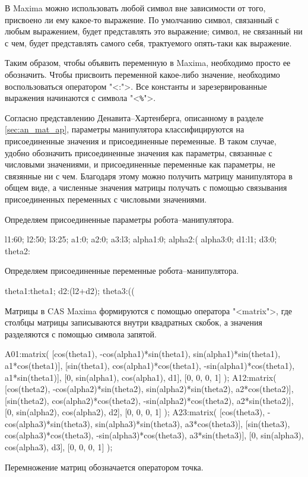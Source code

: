 \documentclass[oneside, final, 14pt]{extarticle}
\begin{document}
{В Maxima можно использовать любой символ вне зависимости от того, присвоено ли ему какое-то выражение.
По умолчанию символ, связанный с любым выражением, будет представлять это выражение; символ, не связанный ни с чем, будет представлять самого себя, трактуемого опять-таки как выражение.
\par
Таким образом, чтобы объявить переменную в Maxima, необходимо просто ее обозначить.
Чтобы присвоить переменной какое-либо значение, необходимо воспользоваться оператором "<{\ttfamily :}">.
Все константы и зарезервированные выражения начинаются с символа "<{\ttfamily \verb|%|}">.
\par
Согласно представлению Денавита--Хартенберга, описанному в разделе \ref{sec:an_mat_ap}, параметры манипулятора классифицируются на присоединенные значения и присоединенные переменные.
В таком случае, удобно обозначить присоединенные значения как параметры, связанные с числовыми значениями, и присоединенные переменные как параметры, не связянные ни с чем.
Благодаря этому можно получить матрицу манипулятора в общем виде, а численные значения матрицы получать с помощью связывания присоединенных переменных с числовыми значениями.
\par
Определяем присоединенные параметры робота--манипулятора.

{\small
\begin{listing}{24}
l1:60;
l2:50;
l3:25;
a1:0;
a2:0;
a3:l3;
alpha1:0;
alpha2:(%
alpha3:0;
d1:l1;
d3:0;
theta2:%
\end{listing}
}
\par
Определяем присоединенные переменные робота--манипулятора.

{\small
\begin{listing}{37}
theta1:theta1;
d2:(l2+d2);
theta3:((%
\end{listing}
}
\par
Матрицы в CAS Maxima формируются с помощью оператора "<{\ttfamily matrix}">, где столбцы матрицы записываются внутри квадратных скобок, а значения разделяются с помощью символа запятой.

{\small
\begin{listing}{41}
A01:matrix(
[cos(theta1), -cos(alpha1)*sin(theta1),
sin(alpha1)*sin(theta1), a1*cos(theta1)],
[sin(theta1), cos(alpha1)*cos(theta1),
-sin(alpha1)*cos(theta1), a1*sin(theta1)],
[0, sin(alpha1), cos(alpha1), d1],
[0, 0, 0, 1]
);
A12:matrix(
[cos(theta2), -cos(alpha2)*sin(theta2),
sin(alpha2)*sin(theta2), a2*cos(theta2)],
[sin(theta2), cos(alpha2)*cos(theta2),
-sin(alpha2)*cos(theta2), a2*sin(theta2)],
[0, sin(alpha2), cos(alpha2), d2],
[0, 0, 0, 1]
);
A23:matrix(
[cos(theta3), -cos(alpha3)*sin(theta3),
sin(alpha3)*sin(theta3), a3*cos(theta3)],
[sin(theta3), cos(alpha3)*cos(theta3),
-sin(alpha3)*cos(theta3), a3*sin(theta3)],
[0, sin(alpha3), cos(alpha3), d3],
[0, 0, 0, 1]
);
\end{listing}
}
\par
Перемножение матриц обозначается оператором точка.

}
\end{document}
